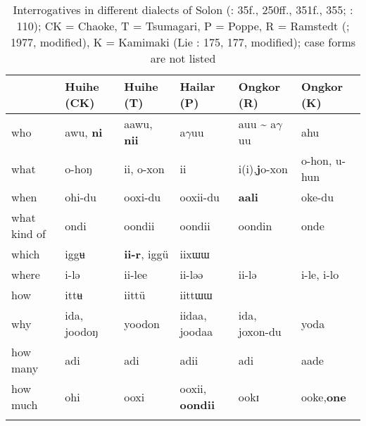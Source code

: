 \begin{table}[t]
\caption{Interrogatives in different dialects of Solon (\citealt{Chaoke2009}: 35f., 250ff., 351f., 355; \citealt{Tsumagari2009a,Poppe1931}: 110); CK = Chaoke, T = Tsumagari, P = Poppe, R = Ramstedt (\citealt{Aalto1976}; 1977, modified), K = Kamimaki (Lie \citealt{Lie1978}: 175, 177, modified); case forms are not listed}
\label{tab:tungu:20}

\begin{tabularx}{\textwidth}{lQQQQQ}
\lsptoprule
& \textbf{Huihe (CK)} & \textbf{Huihe (T)} & \textbf{Hailar (P)} & \textbf{Ongkor (R)} & \textbf{Ongkor (K)}\\
\midrule
who & awu, \textbf{ni} & aawu, \textbf{nii} & a$\gamma $uu & auu {\textasciitilde} a$\gamma $uu & ahu\\
what & o-hoŋ & ii, o-xon & ii & i(i),\newline \textbf{j}o-xon & o-hon, u-hun\\
when & ohi-du & ooxi-du & ooxii-du & \textbf{aali} & oke-du\\
what kind of & ondi & oondii & oondii & oondin & onde\\
which & iggʉ & \textbf{ii-}\textbf{r}, iggü & iixɯɯ &  & \\
where & i-lə & ii-lee & ii-ləə & ii-lə & i-le, i-lo\\
how & ittʉ & iittü & iittɯɯ &  & \\
why & ida, joodoŋ & yoodon & iidaa, joodaa & ida, joxon-du & yoda\\
how many & adi & adi & adii & adi & aade\\
how much & ohi & ooxi & ooxii, \textbf{oondii} & ookɪ & ooke,\newline \textbf{one}\\
\lspbottomrule
\end{tabularx}
\end{table}


